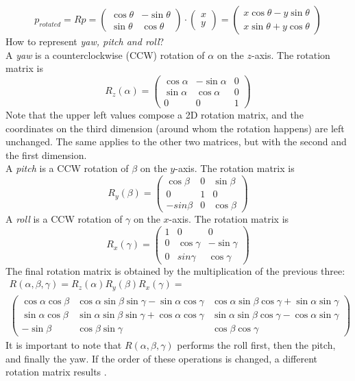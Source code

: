 \[
	p_{rotated} = Rp =
	{\begin{pmatrix}
		\cos \theta &-\sin \theta \\
		\sin \theta &\cos \theta
	\end{pmatrix}}
	\cdot
	{\begin{pmatrix}
		x \\
		y
	\end{pmatrix}} =
	{\begin{pmatrix}
		x\cos \theta -y\sin \theta \\
		x\sin \theta +y\cos \theta
	\end{pmatrix}}
\]
How to represent \textit{yaw, pitch and roll}?\\
A \textit{yaw} is a counterclockwise (CCW) rotation of $\alpha$ on the $z$-axis. The rotation matrix is
\[
	R_z(\alpha) =
	\begin{pmatrix}
		\cos\alpha & -\sin\alpha & 0 \\
		\sin\alpha & \cos\alpha & 0 \\
		0 & 0 & 1
	\end{pmatrix}
\]
Note that the upper left values compose a 2D rotation matrix, and the coordinates on the third dimension (around whom the rotation happens) are left unchanged. The same applies to the other two matrices, but with the second and the first dimension.\\
A \textit{pitch} is a CCW rotation of $\beta$ on the $y$-axis. The rotation matrix is
\[
	R_y(\beta) =
	\begin{pmatrix}
		\cos\beta & 0 & \sin\beta \\
		0 & 1 & 0 \\
		-sin\beta & 0 & \cos\beta
	\end{pmatrix}
\]
A \textit{roll} is a CCW rotation of $\gamma$ on the $x$-axis. The rotation matrix is
\[
	R_x(\gamma) =
	\begin{pmatrix}
		1 & 0 & 0 \\
		0 & \cos\gamma & -\sin\gamma \\
		0 & sin\gamma & \cos\gamma
	\end{pmatrix}
\]
The final rotation matrix is obtained by the multiplication of the previous three:
\begin{gather*}
	R(\alpha, \beta, \gamma) = R_z(\alpha) R_y(\beta) R_x(\gamma) = \\
	\begin{pmatrix}
		\cos\alpha \cos\beta & \cos\alpha \sin\beta \sin\gamma - \sin\alpha \cos\gamma & \cos\alpha \sin\beta \cos\gamma + \sin\alpha \sin\gamma \\
		\sin\alpha \cos\beta & \sin\alpha \sin\beta \sin\gamma + \cos\alpha \cos\gamma & \sin\alpha \sin\beta \cos\gamma - \cos\alpha \sin\gamma \\
		-\sin\beta & \cos\beta \sin\gamma & \cos\beta \cos\gamma
	\end{pmatrix}
\end{gather*}
It is important to note that $R(\alpha, \beta, \gamma)$ performs the roll first, then the pitch, and finally the yaw. If the order of these operations is changed, a different rotation matrix results \cite{Lav06}.

